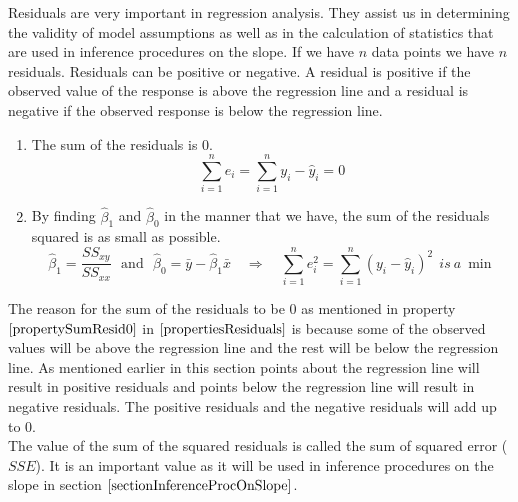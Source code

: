 \noindent
Residuals are very important in regression analysis.
They assist us in determining the validity of model assumptions as well as 
in the calculation of statistics that are used in inference procedures on the slope.
If we have $n$ data points we have $n$ residuals.
Residuals can be positive or negative.
A residual is positive if the observed value of the response
is above the regression line and 
a residual is negative if the observed response 
is below the regression line.

\begin{properties}
\label{propertiesResiduals}
	\begin{enumerate}
	\item	\label{propertySumResid0}
		The sum of the residuals is 0.
		\begin{equation}
		\sum_{i=1}^{n} e_{i} = \sum_{i=1}^{n} y_{i} - \hat{y}_{i} = 0
		\end{equation}
	\item	\label{propertySumSquareResidMin}
		By finding $\hat{\beta}_{1}$ and $\hat{\beta}_{0}$ in the manner that we have,
		the sum of the residuals squared is as small as possible.
		\begin{equation}
		\hat{\beta}_{1} = \frac{SS_{xy}}{SS_{xx}} 
		\text{~~and~~}
		\hat{\beta}_{0} = \bar{y} - \hat{\beta}_{1} \bar{x}
		\quad \Longrightarrow \quad
		\sum_{i=1}^{n} e_{i}^{2} = \sum_{i=1}^{n} (y_{i} - \hat{y}_{i})^{2} ~~is~a~\min
		\end{equation}
		
	\end{enumerate}
\end{properties}

The reason for the sum of the residuals to be 0 as mentioned in 
property $\ref{propertySumResid0}$ in $\ref{propertiesResiduals}$
is because some of the observed values will be above the regression line
and the rest will be below the regression line.
As mentioned earlier in this section
points about the regression line will result in positive residuals and
points below the regression line will result in negative residuals.
The positive residuals and the negative residuals will 
add up to 0.\\

The value of the sum of the squared residuals  
is called the sum of squared error ($SSE$).	
It is an important value as it will be used in inference procedures on the slope
in section $\ref{sectionInferenceProcOnSlope}$.

